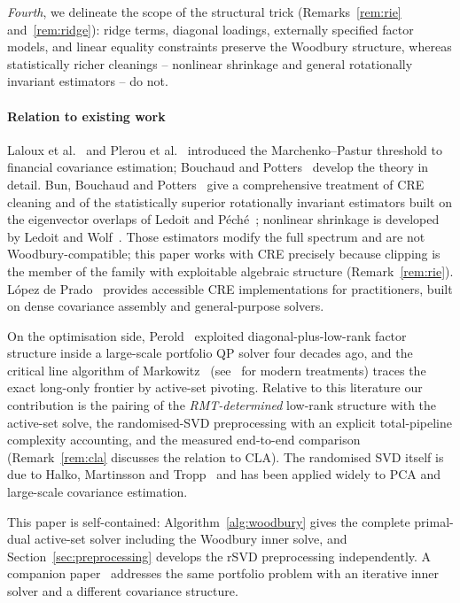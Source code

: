 \emph{Fourth}, we delineate the scope of the structural trick
(Remarks~\ref{rem:rie} and~\ref{rem:ridge}): ridge terms, diagonal loadings,
externally specified factor models, and linear equality constraints preserve
the Woodbury structure, whereas statistically richer cleanings -- nonlinear
shrinkage and general rotationally invariant estimators -- do not.

\paragraph{Relation to existing work}
Laloux et al.~\cite{laloux1999} and Plerou et al.~\cite{plerou1999} introduced
the Marchenko--Pastur threshold to financial covariance estimation; Bouchaud and
Potters~\cite{bouchaud2003} develop the theory in detail.
Bun, Bouchaud and Potters~\cite{bun2017} give a comprehensive treatment of CRE
cleaning and of the statistically superior rotationally invariant estimators
built on the eigenvector overlaps of Ledoit and
P\'ech\'e~\cite{ledoitpeche2011}; nonlinear shrinkage is developed by Ledoit
and Wolf~\cite{ledoit2012,ledoit2020}. Those estimators modify the full
spectrum and are not Woodbury-compatible; this paper works with CRE precisely
because clipping is the member of the family with exploitable algebraic
structure (Remark~\ref{rem:rie}).
L\'opez de Prado~\cite{lopezdeprado2018} provides accessible CRE
implementations for practitioners, built on dense covariance assembly and
general-purpose solvers.

On the optimisation side, Perold~\cite{perold1984} exploited
diagonal-plus-low-rank factor structure inside a large-scale portfolio QP
solver four decades ago, and the critical line algorithm of
Markowitz~\cite{markowitz1956} (see~\cite{niedermayer2010,cvxcla} for modern
treatments) traces the exact long-only frontier by active-set pivoting.
Relative to this literature our contribution is the pairing of the
\emph{RMT-determined} low-rank structure with the active-set solve, the
randomised-SVD preprocessing with an explicit total-pipeline complexity
accounting, and the measured end-to-end comparison
(Remark~\ref{rem:cla} discusses the relation to CLA).
The randomised SVD itself is due to Halko, Martinsson and
Tropp~\cite{halko2011} and has been applied widely to PCA and large-scale
covariance estimation.

This paper is self-contained: Algorithm~\ref{alg:woodbury} gives the complete
primal-dual active-set solver including the Woodbury inner solve, and
Section~\ref{sec:preprocessing} develops the rSVD preprocessing independently.
A companion paper~\cite{fast_minimum_variance} addresses the same portfolio
problem with an iterative inner solver and a different covariance structure.

